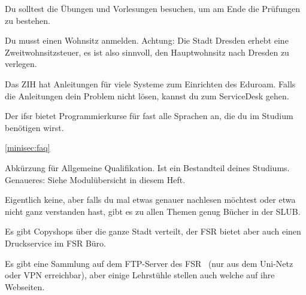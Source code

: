 Du solltest die Übungen und Vorlesungen besuchen, um am Ende die Prüfungen zu bestehen.

Du musst einen Wohnsitz anmelden. Achtung: Die Stadt Dresden erhebt eine Zweitwohnsitzsteuer, es ist also sinnvoll, den Hauptwohnsitz nach Dresden zu verlegen.

Das ZIH hat Anleitungen für viele Systeme zum Einrichten des Eduroam. Falls die Anleitungen dein Problem nicht lösen, kannst du zum ServiceDesk gehen.

Der ifsr bietet Programmierkurse für fast alle Sprachen an, die du im Studium benötigen wirst. 

\label{minisec:faq}
\ref{minisec:faq}

Abkürzung für Allgemeine Qualifikation. Ist ein Bestandteil deines Studiums. Genaueres: Siehe Modulübersicht in diesem Heft.

Eigentlich keine, aber falls du mal etwas genauer nachlesen möchtest oder etwa nicht ganz verstanden hast, gibt es zu allen Themen genug Bücher in der SLUB.

Es gibt Copyshops über die ganze Stadt verteilt, der FSR bietet aber auch einen Druckservice im FSR Büro.

Es gibt eine Sammlung auf dem FTP-Server des FSR~ (nur aus dem Uni-Netz oder VPN erreichbar), aber einige Lehrstühle stellen auch welche auf ihre Webseiten.
